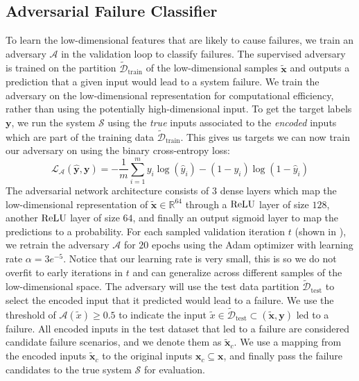 \subsection{Adversarial Failure Classifier}
To learn the low-dimensional features that are likely to cause failures, we train an adversary $\mathcal{A}$ in the validation loop to classify failures.
The supervised adversary is trained on the partition $\tilde{\mathcal{D}}_\text{train}$ of the low-dimensional samples $\tilde{\mathbf{x}}$ and outputs a prediction that a given input would lead to a system failure.
We train the adversary on the low-dimensional representation for computational efficiency, rather than using the potentially high-dimensional input.
To get the target labels $\mathbf{y}$, we run the system $\mathcal{S}$ using the \textit{true} inputs associated to the \textit{encoded} inputs which are part of the training data $\tilde{\mathcal{D}}_\text{train}$. This gives us targets we can now train our adversary on using the binary cross-entropy loss:
\[
\mathcal L_\mathcal{A}(\mathbf{\hat y}, \mathbf{y}) = -\frac{1}{m}\sum_{i=1}^m y_i\log(\hat y_i) - (1 - y_i)\log(1 - \hat y_i)
\]
The adversarial network architecture consists of $3$ dense layers which map the low-dimensional representation of $\tilde{\mathbf{x}} \in \mathbb{R}^{64}$ through a $\operatorname{ReLU}$ layer of size $128$, another $\operatorname{ReLU}$ layer of size $64$, and finally an output sigmoid layer to map the predictions to a probability.
For each sampled validation iteration $t$ (shown in ), we retrain the adversary $\mathcal{A}$ for $20$ epochs using the Adam optimizer with learning rate $\alpha=3e^{-5}$. Notice that our learning rate is very small, this is so we do not overfit to early iterations in $t$ and can generalize across different samples of the low-dimensional space. The adversary will use the test data partition $\tilde{\mathcal{D}}_\text{test}$ to select the encoded input that it predicted would lead to a failure.
We use the threshold of $\mathcal{A}(\tilde{x}) \ge 0.5$ to indicate the input $\tilde{x} \in \tilde{\mathcal{D}}_\text{test} \subset (\tilde{\mathbf{x}}, \mathbf{y})$ led to a failure.
All encoded inputs in the test dataset that led to a failure are considered candidate failure scenarios, and we denote them as $\tilde{\mathbf{x}}_c$.
We use a mapping from the encoded inputs $\tilde{\mathbf{x}}_c$ to the original inputs $\mathbf{x}_c \subseteq \mathbf{x}$, and finally pass the failure candidates to the true system $\mathcal{S}$ for evaluation.


